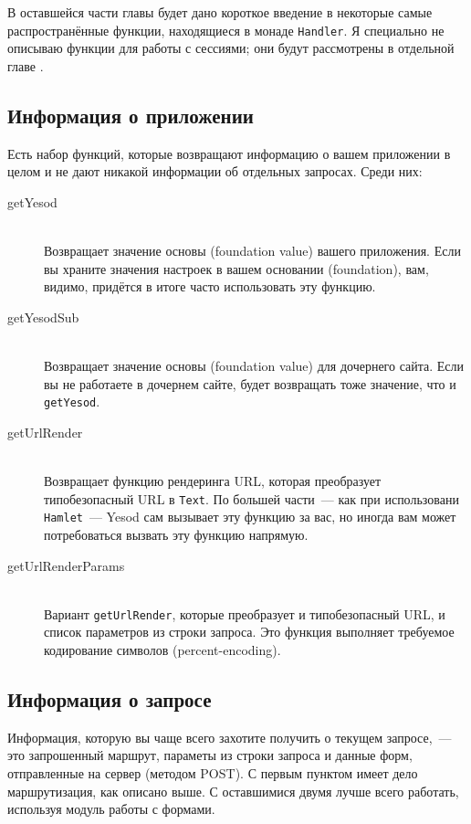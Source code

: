 В оставшейся части главы будет дано короткое введение в некоторые
самые распространённые функции, находящиеся в монаде
\lstinline!Handler!. Я специально не описываю функции для работы с
сессиями; они будут рассмотрены в отдельной главе .

\subsection{Информация о приложении}
Есть набор функций, которые возвращают информацию о вашем приложении в
целом и не дают никакой информации об отдельных запросах. Среди них:
\begin{description}
\item[getYesod] \hfill \\
Возвращает значение основы (foundation value) вашего приложения. Если вы
храните значения настроек в вашем основании (foundation), вам, видимо,
придётся в итоге часто использовать эту функцию.

\item[getYesodSub] \hfill \\
Возвращает значение основы (foundation value) для дочернего сайта. Если вы
не работаете в дочернем сайте, будет возвращать тоже значение, что и
\lstinline!getYesod!.

\item[getUrlRender] \hfill \\
Возвращает функцию рендеринга URL, которая преобразует типобезопасный
URL в \lstinline!Text!. По большей части~--- как при использовани
\lstinline!Hamlet!~--- Yesod сам вызывает эту функцию за вас, но иногда
вам может потребоваться вызвать эту функцию напрямую.

\item[getUrlRenderParams]  \hfill \\
Вариант \lstinline!getUrlRender!, которые преобразует и
типобезопасный URL, и список параметров из строки запроса. Это функция
выполняет требуемое кодирование символов (percent-encoding).
\end{description}

\subsection{Информация о запросе}
Информация, которую вы чаще всего захотите получить о текущем
запросе,~--- это запрошенный маршрут, параметы из строки запроса и
данные форм, отправленные на сервер (методом POST). С первым пунктом имеет
дело маршрутизация, как описано выше. С оставшимися двумя лучше всего
работать, используя модуль работы с формами.

